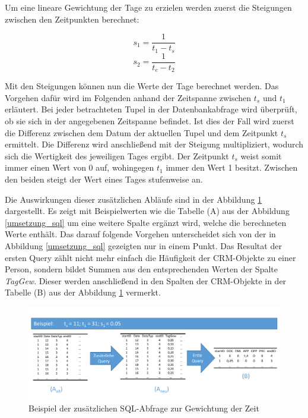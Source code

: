 Um eine lineare Gewichtung der Tage zu erzielen werden zuerst die Steigungen zwischen den Zeitpunkten berechnet:

\begin{equation}
s_1 = \frac{1}{t_1 - t_{s}}
\end{equation}
\begin{equation}
s_2 = \frac{1}{t_{e} - t_2}
\end{equation}

Mit den Steigungen können nun die Werte der Tage berechnet werden. Das Vorgehen dafür wird im Folgenden anhand der Zeitspanne zwischen $t_{s}$ und $t_1$ erläutert. Bei jeder betrachteten Tupel in der Datenbankabfrage wird überprüft, ob sie sich in der angegebenen Zeitspanne befindet. Ist dies der Fall wird zuerst die Differenz zwischen dem Datum der aktuellen Tupel und dem Zeitpunkt $t_{s}$ ermittelt. Die Differenz wird anschließend mit der Steigung multipliziert, wodurch sich die Wertigkeit des jeweiligen Tages ergibt. Der Zeitpunkt $t_{s}$ weist somit immer einen Wert von 0 auf, wohingegen $t_1$ immer den Wert 1 besitzt. Zwischen den beiden steigt der Wert eines Tages stufenweise an. 

Die Auswirkungen dieser zusätzlichen Abläufe sind in der Abbildung \ref{umsetzung_sql2} dargestellt. Es zeigt mit Beispielwerten wie die Tabelle (A) aus der Abbildung \ref{umsetzung_sql} um eine weitere Spalte ergänzt wird, welche die berechneten Werte enthält. Das darauf folgende Vorgehen unterscheidet sich von der in Abbildung \ref{umsetzung_sql} gezeigten nur in einem Punkt. Das Resultat der ersten Query zählt nicht mehr einfach die Häufigkeit der CRM-Objekte zu einer Person, sondern bildet Summen aus den entsprechenden Werten der Spalte \textit{TagGew}. Dieser werden anschließend in den Spalten der CRM-Objekte in der Tabelle (B) aus der Abbildung \ref{umsetzung_sql2} vermerkt.  

\begin{figure}[htbp]
\centering
  \includegraphics[width=1.0\textwidth]{pics/sql_abfrage2.pdf}
\caption{Beispiel der zusätzlichen SQL-Abfrage zur Gewichtung der Zeit}
\label{umsetzung_sql2}
\end{figure}

